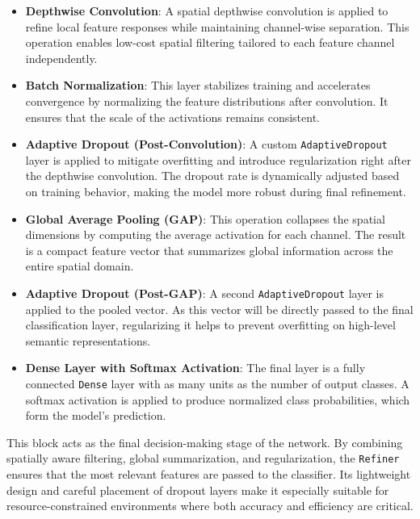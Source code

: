 \begin{itemize}
    \item \textbf{Depthwise Convolution}: A spatial depthwise convolution is applied to refine local feature responses while maintaining channel-wise separation. This operation enables low-cost spatial filtering tailored to each feature channel independently.
    
    \item \textbf{Batch Normalization}: This layer stabilizes training and accelerates convergence by normalizing the feature distributions after convolution. It ensures that the scale of the activations remains consistent.
    
    \item \textbf{Adaptive Dropout (Post-Convolution)}: A custom \texttt{AdaptiveDropout} layer is applied to mitigate overfitting and introduce regularization right after the depthwise convolution. The dropout rate is dynamically adjusted based on training behavior, making the model more robust during final refinement.
    
    \item \textbf{Global Average Pooling (GAP)}: This operation collapses the spatial dimensions by computing the average activation for each channel. The result is a compact feature vector that summarizes global information across the entire spatial domain.
    
    \item \textbf{Adaptive Dropout (Post-GAP)}: A second \texttt{AdaptiveDropout} layer is applied to the pooled vector. As this vector will be directly passed to the final classification layer, regularizing it helps to prevent overfitting on high-level semantic representations.
    
    \item \textbf{Dense Layer with Softmax Activation}: The final layer is a fully connected \texttt{Dense} layer with as many units as the number of output classes. A softmax activation is applied to produce normalized class probabilities, which form the model's prediction.
    
\end{itemize}

This block acts as the final decision-making stage of the network. By combining spatially aware filtering, global summarization, and regularization, the \texttt{Refiner} ensures that the most relevant features are passed to the classifier. Its lightweight design and careful placement of dropout layers make it especially suitable for resource-constrained environments where both accuracy and efficiency are critical.



